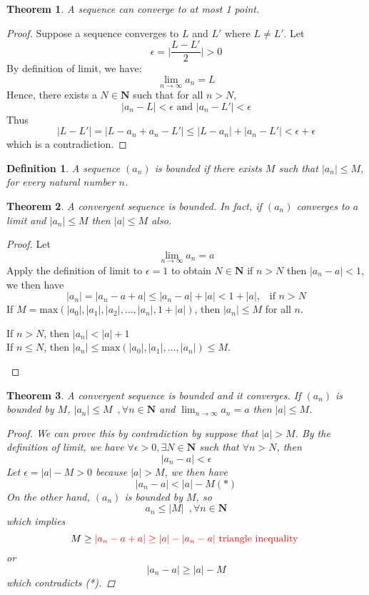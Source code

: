 \documentclass[10pt,letterpaper]{article}
\newtheorem{thm}{Theorem}
\newtheorem{den}{Definition}
\begin{document}
		\begin{thm} A sequence can converge to at most 1 point.
	\end{thm}
	\begin{proof}
	Suppose a sequence converges to $L$ and $L'$ where $L \neq L'$. Let
	$$\epsilon = \bigg|\dfrac{L - L'}{2}| > 0$$
	By definition of limit, we have:
	$$\displaystyle\lim_{n\to\infty} a_n = L$$
	Hence, there exists a $N \in \mathbf{N}$ such that for all $n > N$, 
	$$|a_n - L| < \epsilon \text{ and } |a_n - L'| < \epsilon$$
	Thus 
	$$|L - L'| = |L - a_n + a_n - L'| \leq |L - a_n| + |a_n - L'| < \epsilon + \epsilon$$
	which is a contradiction.
	\end{proof}
	\begin{den}
		A sequence $(a_n)$ is bounded if there exists $M$ such that $|a_n| \leq M$, for every natural
		number $n$.	
	\end{den}
	\begin{thm}
		A convergent sequence is bounded. In fact, if $(a_n)$ converges to $a$ limit and $|a_n| \leq M$ then
		$|a| \leq M$ also.
	\end{thm}
	\begin{proof}
		Let $$\displaystyle\lim_{n\to\infty} a_n = a$$
		Apply the definition of limit to $\epsilon = 1$ to obtain $N \in \mathbf{N}$ if $n > N$ then
		$|a_n - a| < 1$, we then have
		$$|a_n| = |a_n - a + a| \leq |a_n - a| + |a| < 1 + |a|, \, \, \, \text{ if } n > N$$
		If $M = \mathrm{max}(|a_0|, |a_1|, |a_2|, \ldots , |a_n|, 1 + |a|)$, then
		$|a_n| \leq M$ for all $n$. \\
		\begin{center}
		If $n > N$, then $|a_n| < |a| + 1$ \\
		If $n \leq N$, then $|a_n| \leq \mathrm{max}(|a_0|, |a_1|, \ldots, |a_n|) \leq M$.
		\end{center}
	\end{proof}
	
	\begin{thm}
		A convergent sequence is bounded and it converges. If $(a_n)$ is bounded by $M$, $|a_n| \leq M \,\,\,, \forall n
		\in \mathbf{N}$
		and $\displaystyle\lim_{n\to\infty} a_n = a$ then $|a| \leq M$.
		\begin{proof}
		We can prove this by contradiction by suppose that $|a| > M$. By the definition of limit,
		we have $\forall \epsilon > 0, \exists N \in \mathbf{N}$ such that $\forall n > N$, then 
		$$|a_n - a| < \epsilon$$ 
		Let $\epsilon = |a| - M > 0$ because $|a| > M$, we then have
		$$|a_n - a| < |a| - M (*)$$
		On the other hand, $(a_n)$ is bounded by $M$, so 
		$$a_n \leq |M| \,\,\,, \forall n \in \mathbf{N}$$
		which implies
		$$M \geq {\color{red}|a_n - a + a| \geq |a| - |a_n - a| \text{ triangle inequality }}$$
		or $$|a_n - a| \geq |a| - M$$
		which contradicts (*).
		\end{proof}
	\end{thm}
	
\end{document}
